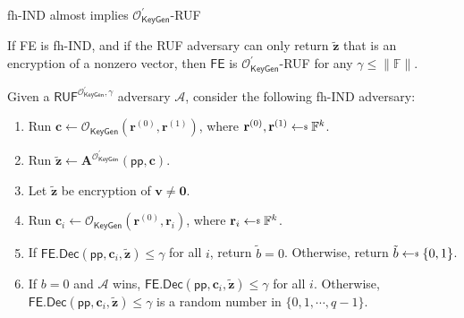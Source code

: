 \begin{frame}{fh-IND almost implies $\mathcal{O}^\prime_{\textsf{KeyGen}}$-RUF}

\begin{theorem}
	If \textsf{FE} is fh-IND, and if the RUF adversary can only return $\mathbf{\tilde{z}}$ that is an encryption of a nonzero vector, then $\textsf{FE}$ is $\mathcal{O}^\prime_{\textsf{KeyGen}}$-RUF for any $\gamma \leq \|\mathbb{F}\|$.
\end{theorem}

Given a $\textsf{RUF}^{\mathcal{O}^\prime_{\textsf{KeyGen}}, \gamma}$ adversary $\mathcal{A}$, consider the following \textsf{fh-IND} adversary:
\begin{enumerate}

	\item Run $ \mathbf{c} \gets \mathcal{O}_{\textsf{KeyGen}}(\mathbf{r}^{(0)}, \mathbf{r}^{(1)})$, where $\mathbf{r}^{(0)}, \mathbf{r}^{(1)} \getsdollar \mathbb{F}^k$.

	\item Run $\mathbf{\tilde{z}} \gets \mathbf{A}^{\mathcal{O}_{\textsf{KeyGen}}^\prime}(\textsf{pp}, \mathbf{c})$.

	\item Let $\mathbf{\tilde{z}}$ be encryption of $\mathbf{v} \neq \mathbf{0}$.

	\item Run $ \mathbf{c}_i \gets \mathcal{O}_{\textsf{KeyGen}}(\mathbf{r}^{(0)}, \mathbf{r}_i)$, where $\mathbf{r}_i \getsdollar \mathbb{F}^k$.

	\item If $\textsf{FE.Dec}(\textsf{pp}, \mathbf{c}_i, \mathbf{\tilde{z}}) \leq \gamma$ for all $i$, return $\tilde{b} = 0$. Otherwise, return $\tilde{b} \getsdollar \{0, 1\}$.

	\item If $b = 0$ and $\mathcal{A}$ wins, $\textsf{FE.Dec}(\textsf{pp}, \mathbf{c}_i, \mathbf{\tilde{z}}) \leq \gamma$ for all $i$. Otherwise, $\textsf{FE.Dec}(\textsf{pp}, \mathbf{c}_i, \mathbf{\tilde{z}}) \leq \gamma$ is a random number in $\{0, 1, \cdots, q-1\}$.

\end{enumerate}


\end{frame}


